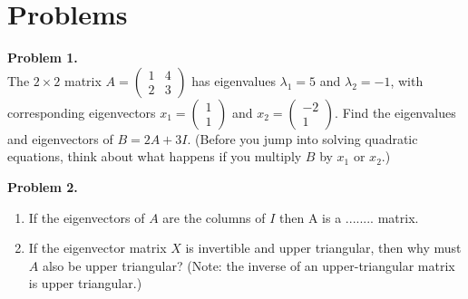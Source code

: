 \documentclass[11pt]{article}
\begin{document}
\section{Problems}
\noindent \textbf{Problem 1.}\\
The $2\times 2$ matrix $A = \begin{pmatrix} 1 & 4 \\ 2 & 3 \end{pmatrix}$ has eigenvalues $\lambda_1 = 5$ and $\lambda_2 = -1$, with corresponding eigenvectors $x_1 = \begin{pmatrix} 1\\1\end{pmatrix}$ and $x_2 = \begin{pmatrix} -2\\1\end{pmatrix}$. Find the eigenvalues and eigenvectors of $B = 2A + 3I$. (Before you jump into solving quadratic equations, think about what happens if you multiply $B$ by $x_1$ or $x_2$.)

\vskip 150pt

\noindent \textbf{Problem 2.}\\
\begin{enumerate}
\item If the eigenvectors of $A$ are the columns of $I$ then A is a ........ matrix.
\item If the eigenvector matrix $X$ is invertible and upper triangular, then why must $A$ also be upper triangular?  (Note: the inverse of an upper-triangular matrix is upper triangular.)
\end{enumerate}

\newpage
\end{document}
